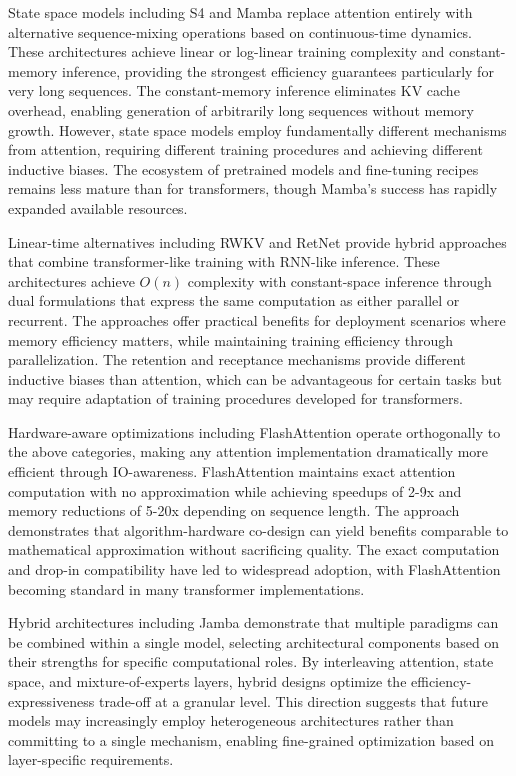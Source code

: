 State space models including S4 and Mamba replace attention entirely with alternative sequence-mixing operations based on continuous-time dynamics. These architectures achieve linear or log-linear training complexity and constant-memory inference, providing the strongest efficiency guarantees particularly for very long sequences. The constant-memory inference eliminates KV cache overhead, enabling generation of arbitrarily long sequences without memory growth. However, state space models employ fundamentally different mechanisms from attention, requiring different training procedures and achieving different inductive biases. The ecosystem of pretrained models and fine-tuning recipes remains less mature than for transformers, though Mamba's success has rapidly expanded available resources.

Linear-time alternatives including RWKV and RetNet provide hybrid approaches that combine transformer-like training with RNN-like inference. These architectures achieve $O(n)$ complexity with constant-space inference through dual formulations that express the same computation as either parallel or recurrent. The approaches offer practical benefits for deployment scenarios where memory efficiency matters, while maintaining training efficiency through parallelization. The retention and receptance mechanisms provide different inductive biases than attention, which can be advantageous for certain tasks but may require adaptation of training procedures developed for transformers.

Hardware-aware optimizations including FlashAttention operate orthogonally to the above categories, making any attention implementation dramatically more efficient through IO-awareness. FlashAttention maintains exact attention computation with no approximation while achieving speedups of 2-9x and memory reductions of 5-20x depending on sequence length. The approach demonstrates that algorithm-hardware co-design can yield benefits comparable to mathematical approximation without sacrificing quality. The exact computation and drop-in compatibility have led to widespread adoption, with FlashAttention becoming standard in many transformer implementations.

Hybrid architectures including Jamba demonstrate that multiple paradigms can be combined within a single model, selecting architectural components based on their strengths for specific computational roles. By interleaving attention, state space, and mixture-of-experts layers, hybrid designs optimize the efficiency-expressiveness trade-off at a granular level. This direction suggests that future models may increasingly employ heterogeneous architectures rather than committing to a single mechanism, enabling fine-grained optimization based on layer-specific requirements.

